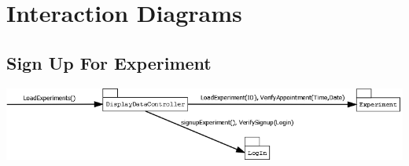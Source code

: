 \section{Interaction Diagrams}
\subsection{Sign Up For Experiment}
\includegraphics[width=6.5in]{../other/interaction_diagrams/browse_signup_experiments.png}